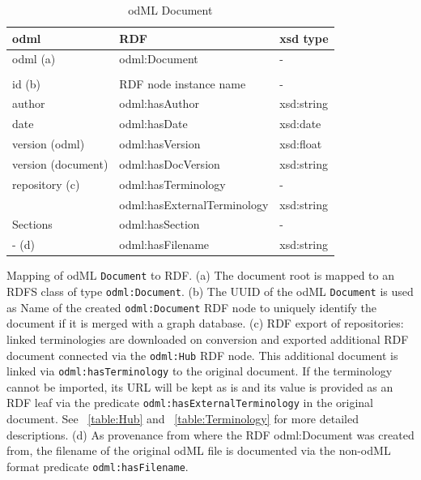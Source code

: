 \documentclass{article}
\begin{document}
\begin{table}
\begin{threeparttable}
\begin{tabular}{p{3.5cm}p{5cm}p{2cm}}
\toprule
    odml                    & RDF                                 & xsd type \\
\midrule
    odml (a)                & odml:Document                       & - \\
                            & & \\
    id (b)                  & RDF node instance name              & - \\
    author                  & odml:hasAuthor                      & xsd:string \\
    date                    & odml:hasDate                        & xsd:date \\
    version (odml)          & odml:hasVersion                     & xsd:float \\
    version (document)      & odml:hasDocVersion                  & xsd:string \\
    repository (c)          & odml:hasTerminology                 & - \\
                            & odml:hasExternalTerminology         & xsd:string \\
    Sections                & odml:hasSection                     & - \\
    - (d)                   & odml:hasFilename                    & xsd:string \\
\bottomrule
\end{tabular}
\caption{odML Document}
\begin{tablenotes}
\small
\item Mapping of odML \texttt{Document} to RDF. (a) The document root is mapped to an RDFS class of type \texttt{odml:Document}. (b) The UUID of the odML \texttt{Document} is used as Name of the created \texttt{odml:Document} RDF node to uniquely identify the document if it is merged with a graph database. (c) RDF export of repositories: linked terminologies are downloaded on conversion and exported additional RDF document connected via the \texttt{odml:Hub} RDF node. This additional document is linked via \texttt{odml:hasTerminology} to the original document. If the terminology cannot be imported, its URL will be kept as is and its value is provided as an RDF leaf via the predicate \texttt{odml:hasExternalTerminology} in the original document. See ~\ref{table:Hub} and ~\ref{table:Terminology} for more detailed descriptions.
(d) As provenance from where the RDF odml:Document was created from, the filename of the original odML file is documented via the non-odML format predicate \texttt{odml:hasFilename}.
\end{tablenotes}
\label{table:Document}
\end{threeparttable}
\end{table}
\end{document}
